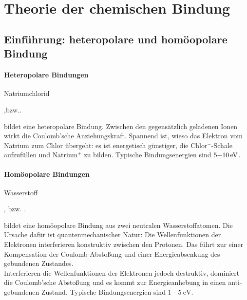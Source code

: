 \section{Theorie der chemischen Bindung}
\subsection{Einführung: heteropolare und homöopolare Bindung}
    \paragraph{Heteropolare Bindungen}
    Natriumchlorid
    \begin{center}
        ,\quad bzw.\quad {}.
    \end{center}
    bildet eine heteropolare Bindung.
    Zwischen den gegensätzlich geladenen Ionen wirkt die Coulomb'sche Anziehungskraft.     
    Spannend ist, wieso das Elektron vom Natrium zum Chlor übergeht: 
    es ist energetisch günstiger, die Chlor${}^-$-Schale aufzufüllen und Natrium${}^+$ zu bilden. 
    Typische Bindungsenergien sind $\SI[parse-numbers=false]{5\text-10}{\electronvolt}$.

    \paragraph{Homöopolare Bindungen}
    Wasserstoff
    \begin{center}
        , \quad bzw. \quad{}.
    \end{center}
    bildet eine homöopolare Bindung aus zwei neutralen Wasserstoffatomen.
    Die Ursache dafür ist quantenmechanischer Natur: 
    Die Wellenfunktionen der Elektronen interferieren konstruktiv zwischen den Protonen.
    Das führt zur einer Kompensation der Coulomb-Abstoßung und einer Energieabsenkung des gebundenen Zustandes.\\

    Interferieren die Wellenfunktionen der Elektronen jedoch destruktiv, dominiert die Coulomb'sche Abstoßung und es kommt zur Energieanhebung in einen anti-gebundenen Zustand.
    Typische Bindungsenergien sind $1$ - $\SI{5}{\electronvolt}$.

